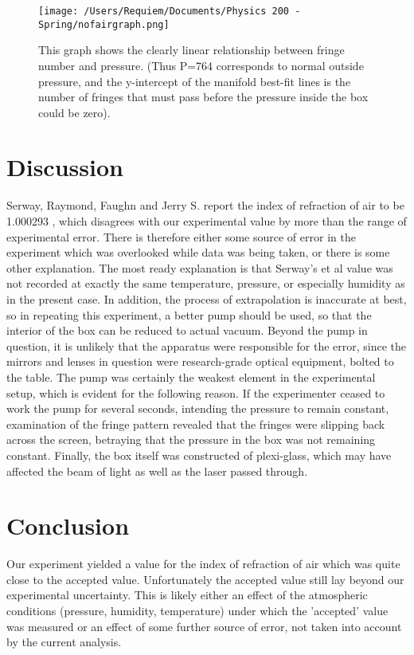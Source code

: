 \documentclass[aps,pre,twocolumn,nofootinbib]{revtex4}
\begin{document}
\begin{figure}[h]
\centering
\texttt{[image: /Users/Requiem/Documents/Physics 200 - Spring/nofairgraph.png]} 
\caption{This graph shows the clearly linear relationship between fringe number and pressure.  (Thus P=764 corresponds to normal outside pressure, and the y-intercept of the manifold best-fit lines is the number of fringes that must pass before the pressure inside the box could be zero).  }
\label{graph}
\end{figure}

\section{Discussion}
Serway, Raymond, Faughn and Jerry S. report the index of refraction of air to be 1.000293 \cite{nofair}, which disagrees with our experimental value by more than the range of experimental error.  There is therefore either some source of error in the experiment which was overlooked while data was being taken, or there is some other explanation.  The most ready explanation is that Serway's et al value was not recorded at exactly the same temperature, pressure, or especially humidity as in the present case.   In addition, the process of extrapolation is inaccurate at best, so in repeating this experiment, a better pump should be used, so that the interior of the box can be reduced to actual vacuum.  Beyond the pump in question, it is unlikely that the apparatus were responsible for the error, since the mirrors and lenses in question were research-grade optical equipment, bolted to the table.  The pump was certainly the weakest element in the experimental setup, which is evident for the following reason.  If the experimenter ceased to work the pump for several seconds, intending the pressure to remain constant, examination of the fringe pattern revealed that the fringes were slipping back across the screen, betraying that the pressure in the box was not remaining constant.  Finally, the box itself was constructed of plexi-glass, which may have affected the beam of light as well as the laser passed through.  

\section{Conclusion}
Our experiment yielded a value for the index of refraction of air which was quite close to the accepted value.  Unfortunately the accepted value still lay beyond our experimental uncertainty.  This is likely either an effect of the atmospheric conditions (pressure, humidity, temperature) under which the 'accepted' value was measured or an effect of some further source of error, not taken into account by the current analysis.  
\end{document}
